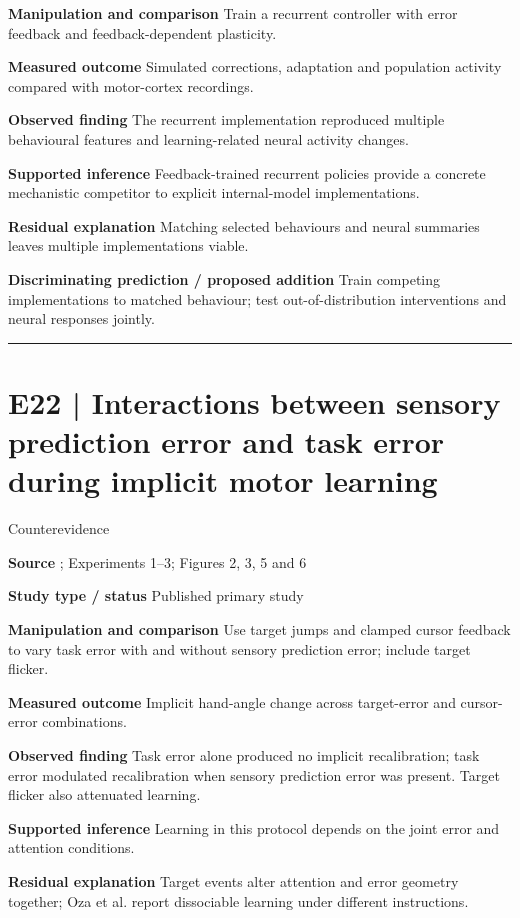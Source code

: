 \documentclass[11pt,a4paper]{article}
\begin{document}
\textbf{Manipulation and comparison} Train a recurrent controller with error feedback and feedback-dependent plasticity.\par
\textbf{Measured outcome} Simulated corrections, adaptation and population activity compared with motor-cortex recordings.\par
\textbf{Observed finding} The recurrent implementation reproduced multiple behavioural features and learning-related neural activity changes.\par
\textbf{Supported inference} Feedback-trained recurrent policies provide a concrete mechanistic competitor to explicit internal-model implementations.\par
\textbf{Residual explanation} Matching selected behaviours and neural summaries leaves multiple implementations viable.\par
\textbf{Discriminating prediction / proposed addition} Train competing implementations to matched behaviour; test out-of-distribution interventions and neural responses jointly.\par
\bigskip\hrule\medskip\section{E22 | Interactions between sensory prediction error and task error during implicit motor learning}
{\small\sffamily\color{navy} Counterevidence}\par
\textbf{Source} \cite{tsay2022}; Experiments 1--3; Figures 2, 3, 5 and 6\par
\textbf{Study type / status} Published primary study\par
\textbf{Manipulation and comparison} Use target jumps and clamped cursor feedback to vary task error with and without sensory prediction error; include target flicker.\par
\textbf{Measured outcome} Implicit hand-angle change across target-error and cursor-error combinations.\par
\textbf{Observed finding} Task error alone produced no implicit recalibration; task error modulated recalibration when sensory prediction error was present. Target flicker also attenuated learning.\par
\textbf{Supported inference} Learning in this protocol depends on the joint error and attention conditions.\par
\textbf{Residual explanation} Target events alter attention and error geometry together; Oza et al. report dissociable learning under different instructions.\par
\end{document}
